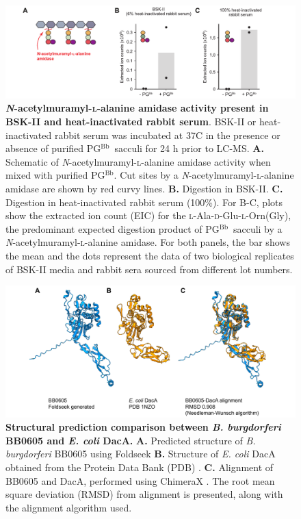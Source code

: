 \documentclass[twoside, watermark]{zHenriquesLab-StyleBioRxiv}
\newcommand{\pgbb}{PG$^\text{Bb}$}
\newcommand{\AEOG}{\textsc{l}-Ala-\textsc{d}-Glu-\textsc{l}-Orn(Gly)}
\newcommand{\scl}{\textsc{l}} %
\begin{document}
\pagebreak
\begin{figure}[ht!]
    \centering
    \includegraphics[width = \textwidth]{Figures/Figure_S6_BSK_has_PGLYRP2_activity.pdf}
    \caption{\textbf{\textit{N}-acetylmuramyl-\scl-alanine amidase activity present in BSK-II and heat-inactivated rabbit serum}. BSK-II or heat-inactivated rabbit serum was incubated at 37\degree C in the presence or absence of purified \pgbb~sacculi for 24 h prior to LC-MS. \textbf{A.} Schematic of \textit{N}-acetylmuramyl-\scl-alanine amidase activity when mixed with purified \pgbb. Cut sites by a \textit{N}-acetylmuramyl-\scl-alanine amidase are shown by red curvy lines. \textbf{B.} Digestion in BSK-II. \textbf{C.} Digestion in heat-inactivated rabbit serum (100\%). For B-C, plots show the extracted ion count (EIC) for the \AEOG, the predominant expected digestion product of \pgbb~sacculi by a \textit{N}-acetylmuramyl-\scl-alanine amidase. For both panels, the bar shows the mean and the dots represent the data of two biological replicates of BSK-II media and rabbit sera sourced from different lot numbers.}
    \label{fig: figS6}
\end{figure}

\pagebreak
\begin{figure}[ht!]
    \centering
    \includegraphics[width = \textwidth]{Figures/Figure_S7_BB0605_alignment.pdf}
    \caption{\textbf{Structural prediction comparison between \textit{B. burgdorferi} BB0605 and \textit{E. coli} DacA.} \textbf{A.} Predicted structure of \textit{B. burgdorferi} BB0605 using Foldseek \cite{Kempen2023} \textbf{B.} Structure of \textit{E. coli} DacA obtained from the Protein Data Bank (PDB) \cite{Berman2000,Nicholas2003}. \textbf{C.} Alignment of BB0605 and DacA, performed using ChimeraX \cite{Meng2023}. The root mean square deviation (RMSD) from alignment is presented, along with the alignment algorithm used.}
    \label{fig: figS7}
\end{figure}
\end{document}

